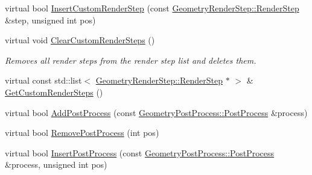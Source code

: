 \begin{DoxyCompactItemize}
\item 
virtual bool \mbox{\hyperlink{class_geometry_engine_1_1_geometry_world_item_1_1_geometry_camera_1_1_camera_aff83b52805cc8085af8f0802ab554c11}{Insert\+Custom\+Render\+Step}} (const \mbox{\hyperlink{class_geometry_engine_1_1_geometry_render_step_1_1_render_step}{Geometry\+Render\+Step\+::\+Render\+Step}} \&step, unsigned int pos)
\item 
\mbox{\label{class_geometry_engine_1_1_geometry_world_item_1_1_geometry_camera_1_1_camera_a59c06151d81ffaa11cd725e17d27429e}} 
virtual void \mbox{\hyperlink{class_geometry_engine_1_1_geometry_world_item_1_1_geometry_camera_1_1_camera_a59c06151d81ffaa11cd725e17d27429e}{Clear\+Custom\+Render\+Steps}} ()
\begin{DoxyCompactList}\small\item\em Removes all render steps from the render step list and deletes them. \end{DoxyCompactList}\item 
virtual const std\+::list$<$ \mbox{\hyperlink{class_geometry_engine_1_1_geometry_render_step_1_1_render_step}{Geometry\+Render\+Step\+::\+Render\+Step}} $\ast$ $>$ \& \mbox{\hyperlink{class_geometry_engine_1_1_geometry_world_item_1_1_geometry_camera_1_1_camera_a55464c946d6e07ea8f00f5236593ee5f}{Get\+Custom\+Render\+Steps}} ()
\item 
virtual bool \mbox{\hyperlink{class_geometry_engine_1_1_geometry_world_item_1_1_geometry_camera_1_1_camera_aefeabe0fe7650e0b6236b59134058845}{Add\+Post\+Process}} (const \mbox{\hyperlink{class_geometry_engine_1_1_geometry_post_process_1_1_post_process}{Geometry\+Post\+Process\+::\+Post\+Process}} \&process)
\item 
virtual bool \mbox{\hyperlink{class_geometry_engine_1_1_geometry_world_item_1_1_geometry_camera_1_1_camera_ae66b1cfa82e67349786b3cf412f93e70}{Remove\+Post\+Process}} (int pos)
\item 
virtual bool \mbox{\hyperlink{class_geometry_engine_1_1_geometry_world_item_1_1_geometry_camera_1_1_camera_a6079f2bacb9134ca0c3d7e8a97993f8c}{Insert\+Post\+Process}} (const \mbox{\hyperlink{class_geometry_engine_1_1_geometry_post_process_1_1_post_process}{Geometry\+Post\+Process\+::\+Post\+Process}} \&process, unsigned int pos)
\item 
\mbox{\label{class_geometry_engine_1_1_geometry_world_item_1_1_geometry_camera_1_1_camera_a97e992ac9c5429aebca4797f5e545e46}} 

\end{DoxyCompactItemize}
